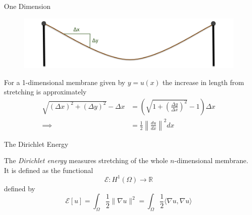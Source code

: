 \documentclass[usenames,dvipsnames]{beamer}
\theoremstyle{definition}
\theoremstyle{theorem}
\newcommand{\R}{\mathbb{R}}
\begin{document}
    \begin{frame}{One Dimension}
        \begin{figure}
            \centering
            \includegraphics[width=.95\textwidth]{images/Dirichlet_Energy.png}
        \end{figure}
        For a 1-dimensional membrane given by $y=u(x)$ the increase in length from stretching is approximately
        \begin{align*}
            \sqrt{(\Delta x)^2+(\Delta y)^2}-\Delta x &= \left(\sqrt{1 + \left( \frac{\Delta y}{\Delta x}\right)^2} - 1\right)\Delta x\\
            \implies&= \frac{1}{2}\left\|\frac{du}{dx}\right\|^2dx
        \end{align*}
    \end{frame}


\begin{frame}{The Dirichlet Energy}
\begin{definition}
    The \emph{Dirichlet energy} measures stretching of the whole $n$-dimensional membrane. It is defined as the functional
    \[
    \mathcal{E}\colon H^1(\Omega) \to \R
    \]
    defined by
    \[
    \mathcal{E}[u]= \int_\Omega \frac{1}{2} \|\nabla u\|^2 = \int_\Omega \frac{1}{2} \langle \nabla u, \nabla u \rangle 
    \]
\end{definition}
\end{frame}
    
    
        
        
\end{document}
